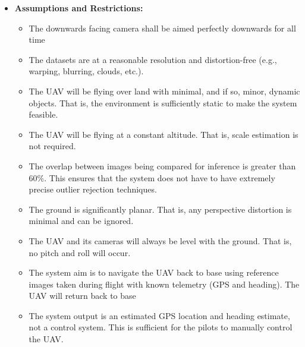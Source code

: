 \begin{itemize}
    \item \textbf{Assumptions and Restrictions:}
    \begin{itemize}
        \item The downwards facing camera shall be aimed perfectly downwards for all time
        \item The datasets are at a reasonable resolution and distortion-free (e.g., warping, blurring, clouds, etc.).
        \item The UAV will be flying over land with minimal, and if so, minor, dynamic objects. That is, the environment is sufficiently static to make the system feasible.
        \item The UAV will be flying at a constant altitude. That is, scale estimation is not required.
        \item The overlap between images being compared for inference is greater than 60\%. This ensures that the system does not have to have extremely precise outlier rejection techniques.
        \item The ground is significantly planar. That is, any perspective distortion is minimal and can be ignored.
        \item The UAV and its cameras will always be level with the ground. That is, no pitch and roll will occur. 
        \item The system aim is to navigate the UAV back to base using reference images taken during flight with known telemetry (GPS and heading). The UAV will return back to base 
        \item The system output is an estimated GPS location and heading estimate, not a control system. This is sufficient for the pilots to manually control the UAV.
    \end{itemize}
\end{itemize}

